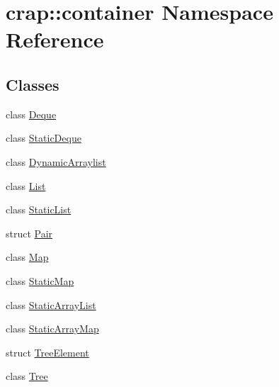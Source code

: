 \hypertarget{namespacecrap_1_1container}{\section{crap\-:\-:container Namespace Reference}
\label{namespacecrap_1_1container}
}
\subsection*{Classes}
\begin{DoxyCompactItemize}
\item 
class \hyperlink{classcrap_1_1container_1_1_deque}{Deque}
\item 
class \hyperlink{classcrap_1_1container_1_1_static_deque}{Static\-Deque}
\item 
class \hyperlink{classcrap_1_1container_1_1_dynamic_arraylist}{Dynamic\-Arraylist}
\item 
class \hyperlink{classcrap_1_1container_1_1_list}{List}
\item 
class \hyperlink{classcrap_1_1container_1_1_static_list}{Static\-List}
\item 
struct \hyperlink{structcrap_1_1container_1_1_pair}{Pair}
\item 
class \hyperlink{classcrap_1_1container_1_1_map}{Map}
\item 
class \hyperlink{classcrap_1_1container_1_1_static_map}{Static\-Map}
\item 
class \hyperlink{classcrap_1_1container_1_1_static_array_list}{Static\-Array\-List}
\item 
class \hyperlink{classcrap_1_1container_1_1_static_array_map}{Static\-Array\-Map}
\item 
struct \hyperlink{structcrap_1_1container_1_1_tree_element}{Tree\-Element}
\item 
class \hyperlink{classcrap_1_1container_1_1_tree}{Tree}
\end{DoxyCompactItemize}
